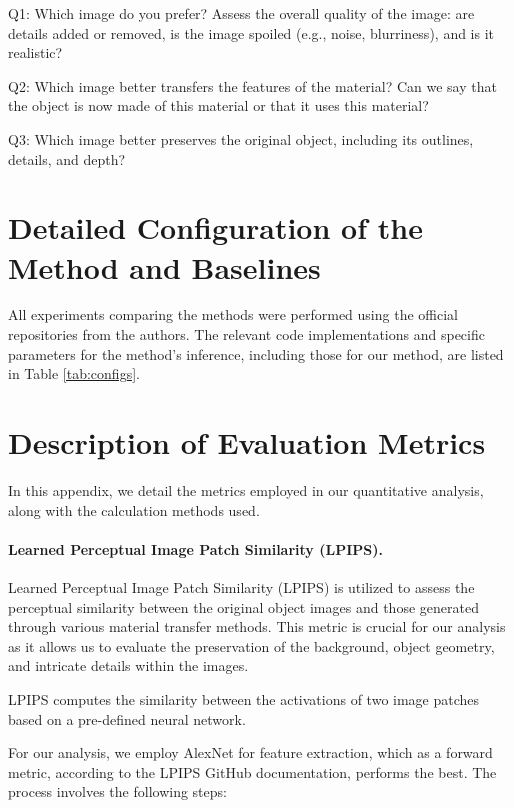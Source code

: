 Q1: Which image do you prefer? Assess the overall quality of the image: are details added or removed, is the image spoiled (e.g., noise, blurriness), and is it realistic?

Q2: Which image better transfers the features of the material? Can we say that the object is now made of this material or that it uses this material?

Q3: Which image better preserves the original object, including its outlines, details, and depth?


\section{Detailed Configuration of the Method and Baselines}
\label{appendix:configs}

All experiments comparing the methods were performed using the official repositories from the authors. The relevant code implementations and specific parameters for the method's inference, including those for our method, are listed in Table \ref{tab:configs}.






 
\section{Description of Evaluation Metrics}
\label{appendix:metrics}

In this appendix, we detail the metrics employed in our quantitative analysis, along with the calculation methods used.

\paragraph{Learned Perceptual Image Patch Similarity (LPIPS).} Learned Perceptual Image Patch Similarity (LPIPS) is utilized to assess the perceptual similarity between the original object images and those generated through various material transfer methods. This metric is crucial for our analysis as it allows us to evaluate the preservation of the background, object geometry, and intricate details within the images.

LPIPS computes the similarity between the activations of two image patches based on a pre-defined neural network. 

For our analysis, we employ AlexNet for feature extraction, which as a forward metric, according to the LPIPS GitHub documentation, performs the best. The process involves the following steps:


